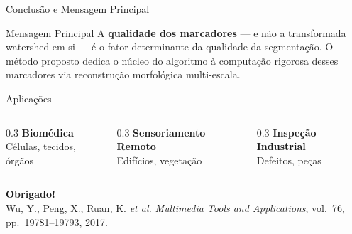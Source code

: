 \documentclass[aspectratio=169,12pt]{beamer}
\begin{document}
\begin{frame}{Conclus\~ao e Mensagem Principal}

\begin{block}{Mensagem Principal}
A \textbf{qualidade dos marcadores} --- e n\~ao a transformada watershed em si --- \'e o fator determinante da qualidade da segmenta\c{c}\~ao. O m\'etodo proposto dedica o n\'ucleo do algoritmo \`a computa\c{c}\~ao rigorosa desses marcadores via reconstru\c{c}\~ao morfol\'ogica multi-escala.
\end{block}

\vspace{0.5cm}

\begin{exampleblock}{Aplica\c{c}\~oes}
\begin{columns}[T]
\begin{column}{0.3\textwidth}
\centering
\textbf{Biom\'edica}\\
C\'elulas, tecidos, \'org\~aos
\end{column}
\begin{column}{0.3\textwidth}
\centering
\textbf{Sensoriamento Remoto}\\
Edif\'icios, vegeta\c{c}\~ao
\end{column}
\begin{column}{0.3\textwidth}
\centering
\textbf{Inspe\c{c}\~ao Industrial}\\
Defeitos, pe\c{c}as
\end{column}
\end{columns}
\end{exampleblock}

\vspace{0.5cm}

\begin{center}
{\Large\bfseries\color{ufamblue} Obrigado!}\\[0.3cm]
{\small Wu, Y., Peng, X., Ruan, K. \textit{et al.} \textit{Multimedia Tools and Applications}, vol.\ 76, pp.\ 19781--19793, 2017.}
\end{center}

\end{frame}
\end{document}
